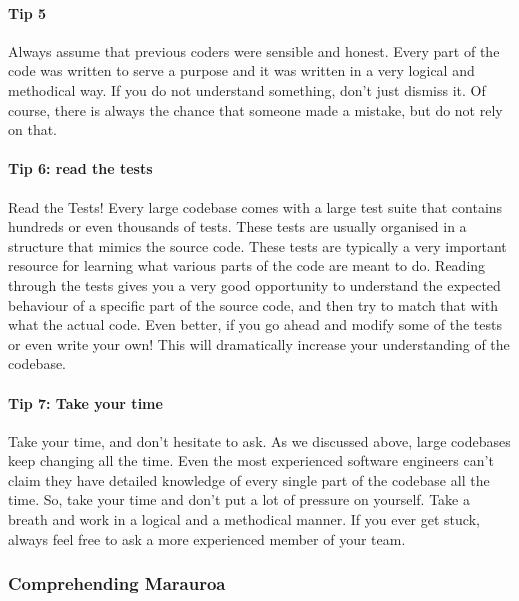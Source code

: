 \documentclass[
]{book}
\begin{document}
\hypertarget{tip5}{%
\paragraph{Tip 5}\label{tip5}}

Always assume that previous coders were sensible and honest. Every part of the code was written to serve a purpose and it was written in a very logical and methodical way. If you do not understand something, don't just dismiss it. Of course, there is always the chance that someone made a mistake, but do not rely on that.

\hypertarget{tip6}{%
\paragraph{Tip 6: read the tests}\label{tip6}}

Read the Tests! Every large codebase comes with a large test suite that contains hundreds or even thousands of tests. These tests are usually organised in a structure that mimics the source code. These tests are typically a very important resource for learning what various parts of the code are meant to do. Reading through the tests gives you a very good opportunity to understand the expected behaviour of a specific part of the source code, and then try to match that with what the actual code. Even better, if you go ahead and modify some of the tests or even write your own! This will dramatically increase your understanding of the codebase.

\hypertarget{tip7}{%
\paragraph{Tip 7: Take your time}\label{tip7}}

Take your time, and don't hesitate to ask. As we discussed above, large codebases keep changing all the time. Even the most experienced software engineers can't claim they have detailed knowledge of every single part of the codebase all the time. So, take your time and don't put a lot of pressure on yourself. Take a breath and work in a logical and a methodical manner. If you ever get stuck, always feel free to ask a more experienced member of your team.

\hypertarget{comprehension}{%
\subsubsection{Comprehending Marauroa}\label{comprehension}}
\end{document}
